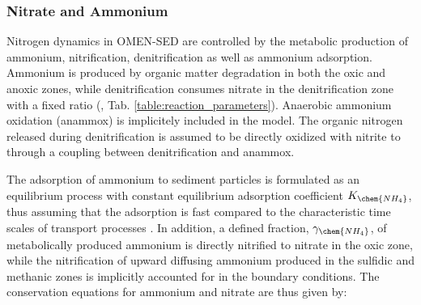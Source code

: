 \documentclass[gmd, manuscript]{copernicus}
\begin{document}
\subsubsection{Nitrate and Ammonium}\label{subsubsec:N}
Nitrogen dynamics in OMEN-SED are controlled by the metabolic production of ammonium, nitrification, denitrification as well as ammonium adsorption. 
Ammonium is produced by organic matter degradation in both the oxic and anoxic zones, while denitrification consumes nitrate in the denitrification zone with a fixed  ratio (, Tab. \ref{table:reaction_parameters}). 
Anaerobic ammonium oxidation (anammox) is implicitely included in the model. The organic nitrogen released during denitrification is assumed to be directly oxidized with nitrite to  through a coupling between denitrification and 
anammox. 

The adsorption of ammonium to sediment particles is formulated as an equilibrium process with constant equilibrium adsorption coefficient $K_\chem{NH_4}$, thus assuming that the adsorption is fast compared to the 
characteristic time scales of transport processes \citep{wang_multicomponent_1996}. In addition, a defined fraction, $\gamma_{\chem{NH_4}}$, of metabolically produced ammonium is directly nitrified to nitrate in the oxic zone, 
while the nitrification of upward diffusing ammonium produced in the sulfidic and methanic zones is implicitly accounted for in the boundary conditions. The conservation equations for ammonium and nitrate are thus given by:
\end{document}
